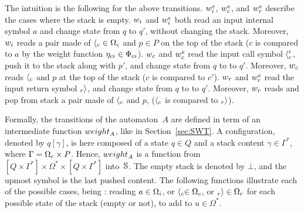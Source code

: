 \noindent
The intuition is the following for the above transitions. 
$\weiei$, $\weiec$, and $\weier$ describe the cases where the stack is empty. 
%
\noindent
$\weii$ and $\weiei$ both read an input internal symbol $a$ and change state from $q$ to $q'$, 
without changing the stack. 
Moreover, $\weii$ reads a pair made of 
${\call{c}} \in \Omegac$ and $p \in P$ on the top of the stack 
($c$ is compared to $a$ by the weight function $\eta_\mathsf{ci} \in \Phici$).
%
\noindent
$\weic$ and $\weiec$ read the input call symbol $\langle_{c}'$, 
push it to the stack along with $p'$, and change state from $q$ to to $q'$.
Moreover, $\weic$ reads ${\langle_{c}}$ and $p$ at the top of the stack 
($c$ is compared to $c'$).
%
\noindent
$\weir$ and $\weier$ read the input return symbol $_{r}{\rangle}$, and change state from $q$ to to $q'$.
Moreover, $\weir$ reads and pop from stack a pair made of $\langle_{c}$ and $p$, 
($\langle_{c}$ is compared to $_{r}{\rangle}$).

Formally, the transitions of the automaton~$A$ are defined
in term of %
an intermediate function $\weight_A$, like in Section~\ref{sec:SWT}.
A configuration, denoted by $q[\gamma]$, 
is here composed of a state $q \in Q$ 
and a stack content $\gamma \in \Gamma^*$, 
where $\Gamma = \Omegac \times P$.
Hence, $\weight_A$ is a function from 
$[Q \times \Gamma^*] \times \Omega^* \times [Q \times \Gamma^*]$ into~$\mathbb{S}$.
The empty stack is denoted by $\bot$, and the upmost symbol is the last pushed content. 
The following functions illustrate each of the possible cases, being : reading $a \in \Omegai$, 
or $\call{c} \in \Omegac$, or $\return{r} \in \Omegar$ for each possible state of the stack (empty or not), 
to add to $u \in {\Omega}^*$.

